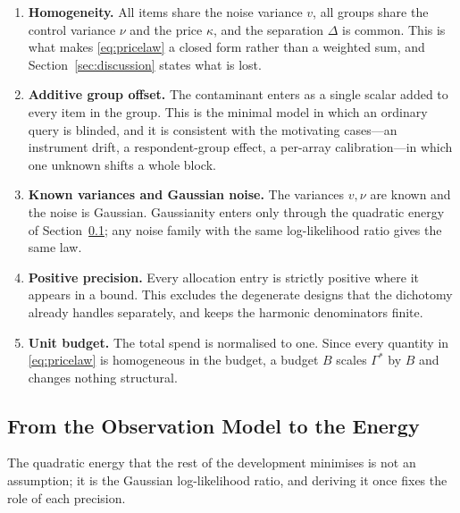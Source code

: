 \documentclass[conference]{IEEEtran}
\theoremstyle{definition}
\begin{document}
\begin{enumerate}
\item[1)] \textbf{Homogeneity.} All items share the noise variance $v$, all groups share the
control variance $\nu$ and the price $\kappa$, and the separation $\Delta$ is common. This
is what makes \eqref{eq:pricelaw} a closed form rather than a weighted sum, and
Section~\ref{sec:discussion} states what is lost.

\item[2)] \textbf{Additive group offset.} The contaminant enters as a single scalar added to
every item in the group. This is the minimal model in which an ordinary query is blinded,
and it is consistent with the motivating cases---an instrument drift, a respondent-group
effect, a per-array calibration---in which one unknown shifts a whole block.

\item[3)] \textbf{Known variances and Gaussian noise.} The variances $v,\nu$ are known and
the noise is Gaussian. Gaussianity enters only through the quadratic energy of
Section~\ref{sec:energy}; any noise family with the same log-likelihood ratio gives the same
law.

\item[4)] \textbf{Positive precision.} Every allocation entry is strictly positive where it
appears in a bound. This excludes the degenerate designs that the dichotomy already handles
separately, and keeps the harmonic denominators finite.

\item[5)] \textbf{Unit budget.} The total spend is normalised to one. Since every quantity
in \eqref{eq:pricelaw} is homogeneous in the budget, a budget $B$ scales
$\Gamma^{*}$ by $B$ and changes nothing structural.
\end{enumerate}

\subsection{From the Observation Model to the Energy}
\label{sec:energy}

The quadratic energy that the rest of the development minimises is not an assumption; it is
the Gaussian log-likelihood ratio, and deriving it once fixes the role of each precision.
\end{document}
